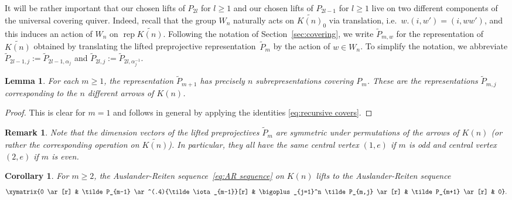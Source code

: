 \documentclass{amsart}
\newtheorem{corollary}[theorem]{Corollary}
\newtheorem{lemma}[theorem]{Lemma}
\newtheorem{remark}[theorem]{Remark}
\numberwithin{equation}{section}
\newcommand{\rep}{\operatorname{rep}}
\begin{document}
It will be rather important that our chosen lifts of $P_{2l}$ for $l\ge1$ and our chosen lifts of $P_{2l-1}$ for $l\ge1$ live on two different components of the universal covering quiver.
Indeed, recall that the group $W_n$ naturally acts on $\widetilde{K(n)}_0$ via translation, i.e.~$w.(i,w')=(i,ww')$, and this induces an action of $W_n$ on $\rep\widetilde{K(n)}$.
Following the notation of Section~\ref{sec:covering}, we write $\tilde P_{m,w}$ for the representation of $\widetilde{K(n)}$ obtained by translating the lifted preprojective representation~$\tilde P_m$ by the action of $w\in W_n$.
To simplify the notation, we abbreviate $\tilde P_{2l-1,j}:=\tilde P_{2l-1,\alpha_j}$ and $\tilde P_{2l,j}:=\tilde P_{2l,\alpha_j^{-1}}$.
\begin{lemma}
  \label{le:shifted subreps}
  For each $m\ge1$, the representation $\tilde P_{m+1}$ has precisely $n$ subrepresentations covering $P_m$.
  These are the representations $\tilde P_{m,j}$ corresponding to the $n$ different arrows of $K(n)$. 
\end{lemma}
\begin{proof}
  This is clear for $m=1$ and follows in general by applying the identities \eqref{eq:recursive covers}.
\end{proof}
\begin{remark}
  Note that the dimension vectors of the lifted preprojectives $\tilde P_m$ are symmetric under permutations of the arrows of $K(n)$ (or rather the corresponding operation on $\widetilde{K(n)}$).
  In particular, they all have the same central vertex $(1,e)$ if $m$ is odd and central vertex $(2,e)$ if $m$ is even.
\end{remark}

\begin{corollary}
  \label{cor:AR lift}
  For $m\ge2$, the Auslander-Reiten sequence~\eqref{eq:AR sequence} on $K(n)$ lifts to the Auslander-Reiten sequence
  \begin{equation}
    \label{eq:lifted AR sequence}
    \xymatrix{0 \ar[r] & \tilde P_{m-1} \ar^(.4){\tilde\iota_{m-1}}[r] & \bigoplus_{j=1}^n \tilde P_{m,j} \ar[r] & \tilde P_{m+1} \ar[r] & 0}.
  \end{equation}
\end{corollary} 
\end{document}
